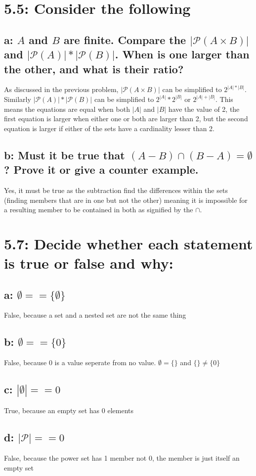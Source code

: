 \documentclass{article}
\begin{document}
\section*{5.5: Consider the following}
\subsection*{a: $A$ and $B$ are finite. Compare the $|\mathcal{P}(A \times B)|$ and $|\mathcal{P}(A)| * |\mathcal{P}(B)|$. When is one larger than the other, and what is their ratio?}
As discussed in the previous problem, $|\mathcal{P}(A \times B)|$ can be simplified to $2^{|A| * |B|}$. Similarly $|\mathcal{P}(A)| * |\mathcal{P}(B)|$ can be simplified to $2^{|A|} * 2^{|B|}$ or $2^{|A|+|B|}$. This means the equations are equal when both $|A|$ and $|B|$ have the value of 2, the first equation is larger when either one or both are larger than 2, but the second equation is larger if either of the sets have a cardinality lesser than 2.
\subsection*{b: Must it be true that $(A-B) \cap (B-A) = \emptyset$? Prove it or give a counter example.}
Yes, it must be true as the subtraction find the differences within the sets (finding members that are in one but not the other) meaning it is impossible for a resulting member to be contained in both as signified by the $\cap$.

\section*{5.7: Decide whether each statement is true or false and why: }
\subsection*{a: $\emptyset == \{\emptyset\}$}
False, because a set and a nested set are not the same thing
\subsection*{b: $\emptyset == \{0\}$}
False, because 0 is a value seperate from no value. $\emptyset = \{\}$ and $\{\} \neq \{0\}$
\subsection*{c: $|\emptyset| == 0$}
True, because an empty set has 0 elements
\subsection*{d: $|\mathcal{P}| == 0$}
False, because the power set has 1 member not 0, the member is just itself an empty set
\end{document}
